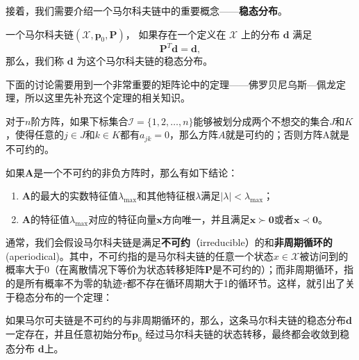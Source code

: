接着，我们需要介绍一个马尔科夫链中的重要概念——\textbf{稳态分布}。
\begin{definition}
    一个马尔科夫链$(\mathcal{X}, \mathbf{p}_0, \mathbf{P})$，
    如果存在一个定义在 $\mathcal{X}$ 上的分布 $\mathbf{d}$ 满足
    \begin{equation}
        \mathbf{P}^T\mathbf{d} = \mathbf{d},
    \end{equation}
    那么，我们称 $\mathbf{d}$ 为这个马尔科夫链的稳态分布。
\end{definition}

下面的讨论需要用到一个非常重要的矩阵论中的定理——佛罗贝尼乌斯—佩龙定理，所以这里先补充这个定理的相关知识。
\begin{definition}[可约方阵和不可约方阵]
    对于$n$阶方阵，如果下标集合$\mathcal{I}=\{1, 2, \ldots, n\}$能够被划分成两个不想交的集合$J$和$K$，使得任意的$j\in J$和$k \in K$都有$a_{jk}=0$，那么方阵$A$就是可约的；否则方阵A就是不可约的。
\end{definition}
\begin{theorem}
    如果$\mathbf{A}$是一个不可约的非负方阵时，那么有如下结论：
    \begin{enumerate}
        \item $\mathbf{A}$的最大的实数特征值$\lambda_{\max}$和其他特征根$\lambda$满足$\vert \lambda \vert < \lambda_{\max}$；
        \item $\mathbf{A}$的特征值$\lambda_{\max}$对应的特征向量$\mathbf{x}$方向唯一，并且满足$\mathbf{x} \succ \mathbf{0}$或者$\mathbf{x} \prec \mathbf{0}$。
    \end{enumerate}
\end{theorem}

通常，我们会假设马尔科夫链是满足\textbf{不可约}（irreducible）的和\textbf{非周期循环的}(aperiodical)。其中，不可约指的是马尔科夫链的任意一个状态$x \in \mathcal{X}$被访问到的概率大于0（在离散情况下等价为状态转移矩阵$\mathbf{P}$是不可约的）；而非周期循环，指的是所有概率不为零的轨迹$\tau$都不存在循环周期大于1的循环节。这样，就引出了关于稳态分布的一个定理：
\begin{theorem}[稳态分布的存在性定理]
    如果马尔可夫链是不可约的与非周期循环的，那么，这条马尔科夫链的稳态分布$\mathbf{d}$一定存在，并且任意初始分布$\mathbf{p}_0$ 经过马尔科夫链的状态转移，最终都会收敛到稳态分布 $\mathbf{d}$上。
\end{theorem}


